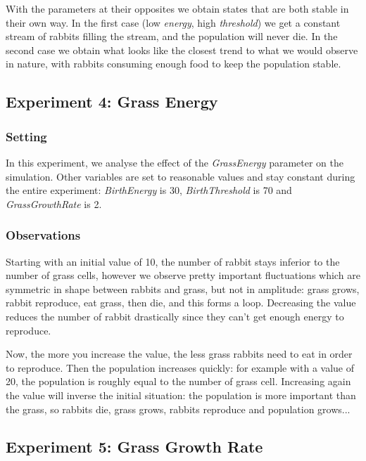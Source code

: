 \documentclass[11pt]{article}
\begin{document}
With the parameters at their opposites we obtain states that are both stable in their own way. In the first case (low \textit{energy}, high \textit{threshold}) we get a constant stream of rabbits filling the stream, and the population will never die. In the second case we obtain what looks like the closest trend to what we would observe in nature, with rabbits consuming enough food to keep the population stable.



\subsection{Experiment 4: Grass Energy}

\subsubsection{Setting}
In this experiment, we analyse the effect of the \textit{GrassEnergy} parameter on the simulation. Other variables are set to reasonable values and stay constant during the entire experiment: \textit{BirthEnergy} is 30, \textit{BirthThreshold} is 70 and \textit{GrassGrowthRate} is 2.

\subsubsection{Observations}
Starting with an initial value of 10, the number of rabbit stays inferior to the number of grass cells, however we observe pretty important fluctuations which are symmetric in shape between rabbits and grass, but not in amplitude: grass grows, rabbit reproduce, eat grass, then die, and this forms a loop. Decreasing the value reduces the number of rabbit drastically since they can't get enough energy to reproduce. 

Now, the more you increase the value, the less grass rabbits need to eat in order to reproduce. Then the population increases quickly: for example with a value of 20, the population is roughly equal to the number of grass cell. Increasing again the value will inverse the initial situation: the population is more important than the grass, so rabbits die, grass grows, rabbits reproduce and population grows...

\subsection{Experiment 5: Grass Growth Rate}
\end{document}
